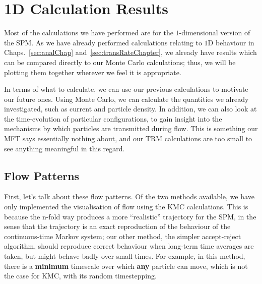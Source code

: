 \section{1D Calculation Results} \label{sec:1dMonteCarlo}
Most of the calculations we have performed are for the $1$-dimensional version of the SPM. As we 
have already performed calculations relating to $1$D behaviour in Chaps.~\ref{sec:analChap}
and~\ref{sec:transRateChapter}, we already have results which can be compared directly to our
Monte Carlo calculations; thus, we will be plotting them together wherever we feel it is
appropriate.

In terms of what to calculate, we can use our previous calculations to motivate our future ones.
Using Monte Carlo, we can calculate the quantities we already investigated, such as current and 
particle density. In addition, we can also look at the time-evolution of particular configurations,
to gain insight into the mechanisms by which particles are transmitted during flow. This is
something our MFT says essentially nothing about, and our TRM calculations are too small to see 
anything meaningful in this regard.

\subsection{Flow Patterns} \label{sec:flowPatternVis}

First, let's talk about these flow patterns. Of the two methods available, we have only implemented
the visualisation of flow using the KMC calculations. This is because the n-fold way produces
a more ``realistic'' trajectory for the SPM, in the sense that the trajectory is an exact 
reproduction of the behaviour of the continuous-time Markov system; our other method, the simpler
accept-reject algorithm, should reproduce correct behaviour when long-term time averages are taken,
but might behave badly over small times. For example, in this method, there is a \textbf{minimum} timescale
over which \textbf{any} particle can move, which is not the case for KMC, with its random timestepping.

